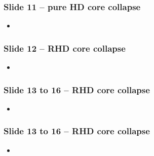 \documentclass{beamer}
\begin{document}
\begin{frame}
 \frametitle{Slide 11 -- pure HD core collapse}
 \begin{itemize}
   \item
 \end{itemize}
\end{frame}
\begin{frame}
 \frametitle{Slide 12 -- RHD core collapse}
 \begin{itemize}
   \item
 \end{itemize}
\end{frame}
\begin{frame}
 \frametitle{Slide 13 to 16 -- RHD core collapse}
 \begin{itemize}
   \item
 \end{itemize}
\end{frame}
\begin{frame}
 \frametitle{Slide 13 to 16 -- RHD core collapse}
 \begin{itemize}
   \item
 \end{itemize}
\end{frame}
\end{document}
